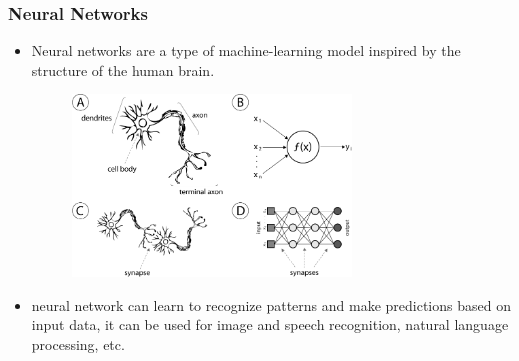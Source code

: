 
\begin{frame}
\frametitle{Neural Networks}
\begin{itemize}
\item Neural networks are a type of machine-learning model inspired by the structure of the human brain.
\begin{figure}[h]
\centering
\includegraphics[width=0.7\textwidth]{figures/neural_brain.png}
\end{figure}
\item neural network can learn to recognize patterns and make predictions based on input data, it can be used for image and speech recognition, natural language processing, etc.

\end{itemize}
\end{frame}


